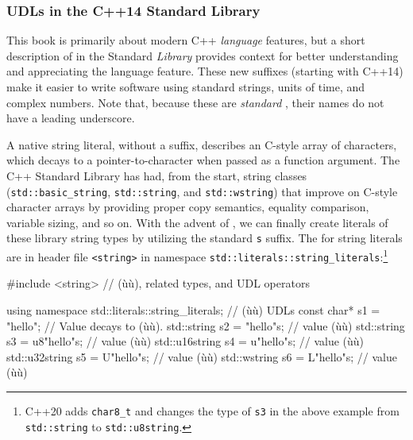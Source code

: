 \subsubsection[UDLs in the C++14 Standard Library]{UDLs in the C++14 Standard Library}\label{udls-in-the-c++14-standard-library}

This book is primarily about modern C++ \emph{language} features, but a
short description of  in the Standard
\emph{Library} provides context for better understanding and
appreciating the  language feature. These new suffixes
(starting with C++14) make it easier to write software using standard
strings, units of time, and complex numbers. Note that, because these
are \emph{standard} , their names do not have a
leading underscore.

A native string literal, without a suffix, describes an C-style array of
characters, which decays to a pointer-to-character when passed as a
function argument. The C++ Standard Library has had, from the start,
string classes (\lstinline!std::basic_string!, \lstinline!std::string!, and
\lstinline!std::wstring!) that improve on C-style character arrays by
providing proper copy semantics, equality comparison, variable sizing,
and so on. With the advent of , we can finally create
literals of these library string types by utilizing the standard
\lstinline!s! suffix. The  for string literals are in
header file \lstinline!<string>! in namespace\linebreak%
\lstinline!std::literals::string_literals!:{\cprotect\footnote{C++20 adds \lstinline!char8_t!
and changes the type of \lstinline!s3! in the above example from \lstinline!std::string! to
\lstinline!std::u8string!.}}

\begin{emcppslisting}[emcppsstandards=c++14]
#include <string>  // (ù{}ù), related types, and UDL operators

using namespace std::literals::string_literals;  // (ù{}ù) UDLs
const char*    s1 =   "hello";    // Value decays to (ù{}ù).
std::string    s2 =   "hello"s;   // value (ù{}ù)
std::string    s3 = u8"hello"s;   // value (ù{}ù)
std::u16string s4 =  u"hello"s;   // value (ù{}ù)
std::u32string s5 =  U"hello"s;   // value (ù{}ù)
std::wstring   s6 =  L"hello"s;   // value (ù{}ù)
\end{emcppslisting}
    
